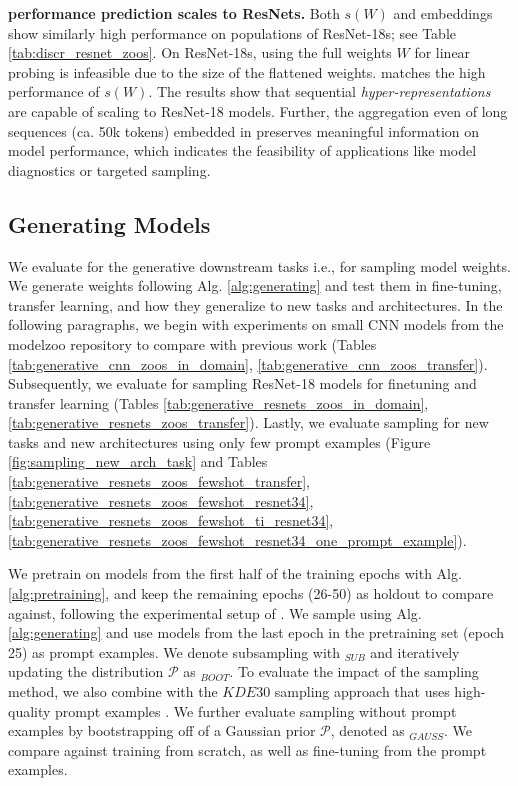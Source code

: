 \newpage
\textbf{\ourmethod performance prediction scales to ResNets.} 
Both $s(W)$ and \ourmethod embeddings show similarly high performance on populations of ResNet-18s; see Table \ref{tab:discr_resnet_zoos}. 
On ResNet-18s, using the full weights $W$ for linear probing is infeasible due to the size of the flattened weights.
\ourmethod matches the high performance of $s(W)$. 
The results show that sequential \textit{hyper-representations} are capable of scaling to ResNet-18 models. 
Further, the aggregation even of long sequences (ca. 50k tokens) embedded in \ourmethod preserves meaningful information on model performance, which indicates the feasibility of applications like model diagnostics or targeted sampling.~
% 
% 
% 
\subsection{Generating Models}
\label{sec:generating_models}
We evaluate \ourmethod for the generative downstream tasks i.e., for sampling model weights. 
We generate weights following Alg. \ref{alg:generating} and test them in fine-tuning, transfer learning, and how they generalize to new tasks and architectures. 
In the following paragraphs, we begin with experiments on small CNN models from the modelzoo repository to compare with previous work (Tables \ref{tab:generative_cnn_zoos_in_domain}, \ref{tab:generative_cnn_zoos_transfer}). 
Subsequently, we evaluate \ourmethod for sampling ResNet-18 models for finetuning and transfer learning (Tables \ref{tab:generative_resnets_zoos_in_domain}, \ref{tab:generative_resnets_zoos_transfer}). 
Lastly, we evaluate sampling for new tasks and new architectures using only few prompt examples (Figure \ref{fig:sampling_new_arch_task} and Tables \ref{tab:generative_resnets_zoos_fewshot_transfer}, \ref{tab:generative_resnets_zoos_fewshot_resnet34}, \ref{tab:generative_resnets_zoos_fewshot_ti_resnet34}, \ref{tab:generative_resnets_zoos_fewshot_resnet34_one_prompt_example}).

We pretrain \ourmethod on models from the first half of the training epochs with Alg. \ref{alg:pretraining}, and keep the remaining epochs (26-50) as holdout to compare against, following the experimental setup of \citep{schurholtHyperRepresentationsGenerativeModels2022}. 
We sample using Alg. \ref{alg:generating} and use models from the last epoch in the pretraining set (epoch 25) as prompt examples. 
We denote subsampling with \ourmethod$_{SUB}$ and iteratively updating the distribution $\mathcal{P}$ as \ourmethod$_{BOOT}$. To evaluate the impact of the sampling method, we also combine \ourmethod with the $KDE30$ sampling approach that uses high-quality prompt examples \citep{schurholtHyperRepresentationsGenerativeModels2022}. We further evaluate sampling without prompt examples by bootstrapping off of a Gaussian prior $\mathcal{P}$, denoted as \ourmethod$_{GAUSS}$. We compare against training from scratch, as well as fine-tuning from the prompt examples.

